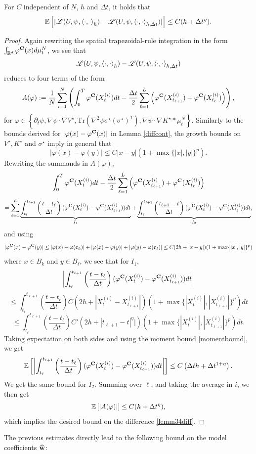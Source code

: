 \documentclass[english,reqno]{amsart}
\begin{document}
\begin{lemm}\label{discreteeffects}
For $C$ independent of $N$, $h$ and $\Delta t$, it holds that
\[\mathbb{E}\left[|\mathscr{L}(U,\psi, \left\langle \cdot,\cdot\right\rangle_h)-\mathscr{L}(U, \psi, \left\langle\cdot,\cdot\right\rangle_{h,\Delta t})|\right]\leq C(h+\Delta t^\eta).\]
\end{lemm}
\begin{proof}
Again rewriting the spatial trapezoidal-rule integration in the form $\int_{\mathbb{R}^d}\varphi^{\mathbf{C}}(x)d\mu^N_t$, we see that 
\begin{equation}\label{lemm34diff}
\mathscr{L}(U,\psi, \left\langle \cdot,\cdot\right\rangle_h)-\mathscr{L}(U, \psi, \left\langle\cdot,\cdot\right\rangle_{h,\Delta t})
\end{equation}
reduces to four terms of the form 
\[A(\varphi):=\frac{1}{N}\sum_{i=1}^N\left(\int_0^T \varphi^{\mathbf{C}}(X^{(i)}_t)dt - \frac{\Delta t}{2}\sum_{\ell=1}^L \left(\varphi^{\mathbf{C}}(X^{(i)}_{t_{\ell+1}})+\varphi^{\mathbf{C}}(X^{(i)}_{t_\ell})\right)\right),\]
for $\varphi\in\left\{\partial_t\psi, \nabla \psi\cdot\nabla V^\star, \text{Tr}(\nabla^2\psi\sigma^\star(\sigma^\star)^T), \nabla\psi\cdot\nabla K^\star*\mu^N_t\right\}$. Similarly to the bounds derived for $|\varphi(x)-\varphi^{\mathbf{C}}(x)|$ in Lemma \ref{diffcont}, the growth bounds on $V^\star,K^\star$ and $\sigma^\star$ imply in general that 
\[|\varphi(x)-\varphi(y)|\leq C|x-y|\left(1+\max\{|x|,|y|\}^p\right).\] 
Rewriting the summands in $A(\varphi)$,
\[\int_0^T \varphi^{\mathbf{C}}(X^{(i)}_t)dt - \frac{\Delta t}{2}\sum_{\ell=1}^L \left(\varphi^{\mathbf{C}}(X^{(i)}_{t_{\ell+1}})+\varphi^{\mathbf{C}}(X^{(i)}_{t_\ell})\right)\]
\[=\sum_{\ell=1}^L\underbrace{\int_{t_\ell}^{t_{\ell+1}} \left(\frac{t-t_\ell}{\Delta t}\right)(\varphi^{\mathbf{C}}(X^{(i)}_t)-\varphi^{\mathbf{C}}(X^{(i)}_{t_{\ell+1}}))dt}_{I_1}+ \underbrace{\int_{t_\ell}^{t_{\ell+1}} \left(\frac{t_{\ell+1}-t}{\Delta t}\right)(\varphi^{\mathbf{C}}(X^{(i)}_t)-\varphi^{\mathbf{C}}(X^{(i)}_{t_{\ell}}))dt}_{I_2},\]
and using 
\[|\varphi^{\mathbf{C}}(x)-\varphi^{\mathbf{C}}(y)|\leq |\varphi(x)-\varphi(\mathbf{c}_k)|+|\varphi(x)-\varphi(y)|+|\varphi(y)-\varphi(\mathbf{c}_\ell)|\leq C(2h+|x-y|)(1+\max\{|x|,|y|\}^p)\]
where $x\in B_k$ and $y\in B_\ell$, we see that for $I_1$,
\[\left\vert\int_{t_\ell}^{t_{\ell+1}} \left(\frac{t-t_\ell}{\Delta t}\right)(\varphi^{\mathbf{C}}(X^{(i)}_t)-\varphi^{\mathbf{C}}(X^{(i)}_{t_{\ell+1}}))dt\right\vert\]
\[\leq \int_{t_\ell}^{t_{\ell+1}} \left(\frac{t-t_\ell}{\Delta t}\right)C(2h+|X_t^{(i)}-X^{(i)}_{t_{\ell+1}}|)(1+\max\{|X^{(i)}_t|,|X^{(i)}_{t_{\ell+1}}|\}^p)dt\]
\[\leq \int_{t_\ell}^{t_{\ell+1}} \left(\frac{t-t_\ell}{\Delta t}\right)C'(2h+|t_{\ell+1}-t|^\eta|)(1+\max\{|X^{(i)}_t|,|X^{(i)}_{t_{\ell+1}}|\}^p)dt.\]
Taking expectation on both sides and using the moment bound \eqref{momentbound}, we get
\[\mathbb{E}\left[\left\vert\int_{t_\ell}^{t_{\ell+1}} \left(\frac{t-t_\ell}{\Delta t}\right)(\varphi^{\mathbf{C}}(X^{(i)}_t)-\varphi^{\mathbf{C}}(X^{(i)}_{t_{\ell+1}}))dt\right\vert\right]\leq C\left(\Delta t h+\Delta t^{1+\eta}\right).\]
We get the same bound for $I_2$. Summing over $\ell$, and taking the average in $i$, we then get 
\[\mathbb{E}\left[|A(\varphi)|\right]\leq C(h+\Delta t^\eta),\]
which implies the desired bound on the difference \eqref{lemm34diff}.
\end{proof}
The previous estimates directly lead to the following bound on the model coefficients ${\widehat{\mathbf{w}}}$:
\end{document}
